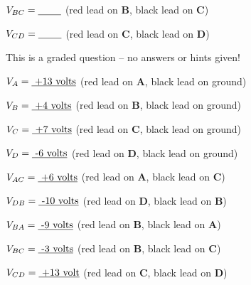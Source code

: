 $V_{BC} = \hbox{\underbar{ \hskip 20pt}}$ (red lead on {\bf B}, black lead on {\bf C})

\vskip 5pt

$V_{CD} = \hbox{\underbar{ \hskip 20pt}}$ (red lead on {\bf C}, black lead on {\bf D})

\vfil 

\eject






This is a graded question -- no answers or hints given!







$V_A = \hbox{\underbar{ +13 volts}}$ (red lead on {\bf A}, black lead on ground)

\vskip 5pt

$V_B = \hbox{\underbar{ +4 volts}}$ (red lead on {\bf B}, black lead on ground)

\vskip 5pt

$V_C = \hbox{\underbar{ +7 volts}}$ (red lead on {\bf C}, black lead on ground)

\vskip 5pt

$V_D = \hbox{\underbar{ -6 volts}}$ (red lead on {\bf D}, black lead on ground)

\vskip 20pt

\goodbreak

$V_{AC} = \hbox{\underbar{ +6 volts}}$ (red lead on {\bf A}, black lead on {\bf C})

\vskip 5pt

$V_{DB} = \hbox{\underbar{ -10 volts}}$ (red lead on {\bf D}, black lead on {\bf B})

\vskip 5pt

$V_{BA} = \hbox{\underbar{ -9 volts}}$ (red lead on {\bf B}, black lead on {\bf A})

\vskip 5pt

$V_{BC} = \hbox{\underbar{ -3 volts}}$ (red lead on {\bf B}, black lead on {\bf C})

\vskip 5pt

$V_{CD} = \hbox{\underbar{ +13 volt}}$ (red lead on {\bf C}, black lead on {\bf D})





